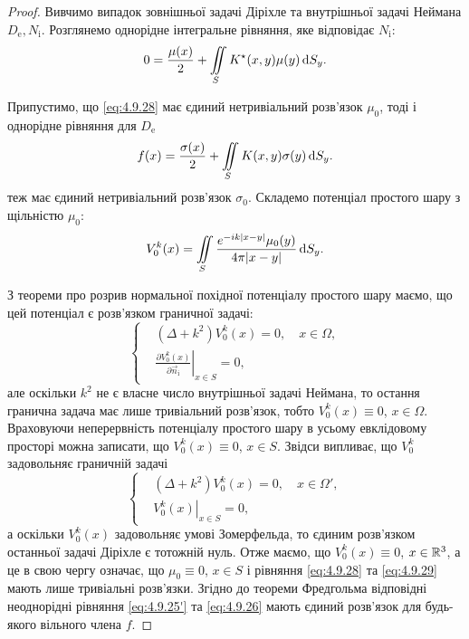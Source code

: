 \begin{proof}
	Вивчимо випадок зовнішньої задачі Діріхле та внутрішньої задачі Неймана $D_{\text{e}}, N_{\text{i}}$. Розглянемо однорідне інтегральне рівняння, яке відповідає $N_{\text{i}}$:
	\begin{equation}
		\label{eq:4.9.28}
		0 = \frac{\mu(x)}{2} + \displaystyle\iint\limits_S K^\star(x, y) \mu(y) \mathop{}\!\mathrm{d} S_y. 
	\end{equation}

	Припустимо, що \eqref{eq:4.9.28} має єдиний нетривіальний розв'язок $\mu_0$, тоді і однорідне рівняння для $D_{\text{e}}$
	\begin{equation}
		\label{eq:4.9.29}
		f(x) = \frac{\sigma(x)}{2} + \displaystyle\iint\limits_S K(x, y) \sigma(y) \mathop{}\!\mathrm{d} S_y. 
	\end{equation}
	теж має єдиний нетривіальний розв'язок $\sigma_0$. Складемо потенціал простого шару з щільністю $\mu_0$:
	\begin{equation}
		V_0^k(x) = \displaystyle\iint\limits_S \frac{e^{-ik|x-y|}\mu_0(y)}{4\pi|x-y|}\mathop{}\!\mathrm{d} S_y.	
	\end{equation}

	З теореми про розрив нормальної похідної потенціалу простого шару маємо, що цей потенціал є розв'язком граничної задачі:
	\begin{equation}
		\left\{
			\begin{aligned}
				& (\Delta + k^2) V_0^k(x) = 0, \quad x \in \Omega, \\
				& \left. \frac{\partial V_0^k(x)}{\partial \vec n_{\text{i}}} \right|_{x \in S} = 0,
			\end{aligned}
		\right.
	\end{equation}
	але оскільки $k^2$ не є власне число внутрішньої задачі Неймана, то остання гранична задача має лише тривіальний розв'язок, тобто $V_0^k(x) \equiv 0$, $x \in \Omega$. Враховуючи неперервність потенціалу простого шару в усьому евклідовому просторі можна записати, що $V_0^k(x) \equiv 0$, $x \in S$. Звідси випливає, що $V_0^k$ задовольняє граничній задачі
	\begin{equation}
		\left\{
			\begin{aligned}
				& (\Delta + k^2) V_0^k(x) = 0, \quad x \in \Omega', \\
				& \left. V_0^k(x) \right|_{x \in S} = 0,
			\end{aligned}
		\right.
	\end{equation}
	а оскільки $V_0^k(x)$ задовольняє умові Зомерфельда, то єдиним розв'язком останньої задачі Діріхле є тотожній нуль. Отже маємо, що $V_0^k(x) \equiv 0$, $x \in \mathbb{R}^3$, а це в свою чергу означає, що $\mu_0 \equiv 0$, $x \in S$ і рівняння \eqref{eq:4.9.28} та \eqref{eq:4.9.29} мають лише тривіальні розв'язки. Згідно до теореми Фредгольма відповідні неоднорідні рівняння \eqref{eq:4.9.25'} та \eqref{eq:4.9.26} мають єдиний розв'язок для будь-якого вільного члена $f$.
\end{proof}